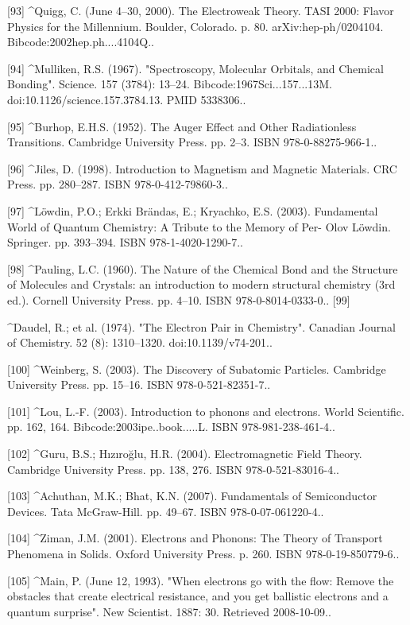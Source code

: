[93]
^Quigg, C. (June 4–30, 2000). The Electroweak Theory. TASI 2000: Flavor Physics for the Millennium. Boulder, Colorado. p. 80. arXiv:hep-ph/0204104. Bibcode:2002hep.ph....4104Q..

[94]
^Mulliken, R.S. (1967). "Spectroscopy, Molecular Orbitals, and Chemical Bonding". Science. 157 (3784): 13–24. Bibcode:1967Sci...157...13M. doi:10.1126/science.157.3784.13. PMID 5338306..

[95]
^Burhop, E.H.S. (1952). The Auger Effect and Other Radiationless Transitions. Cambridge University Press. pp. 2–3. ISBN 978-0-88275-966-1..

[96]
^Jiles, D. (1998). Introduction to Magnetism and Magnetic Materials. CRC Press. pp. 280–287. ISBN 978-0-412-79860-3..

[97]
^Löwdin, P.O.; Erkki Brändas, E.; Kryachko, E.S. (2003). Fundamental World of Quantum Chemistry: A Tribute to the Memory of Per- Olov Löwdin. Springer. pp. 393–394. ISBN 978-1-4020-1290-7..

[98]
^Pauling, L.C. (1960). The Nature of the Chemical Bond and the Structure of Molecules and Crystals: an introduction to modern structural chemistry (3rd ed.). Cornell University Press. pp. 4–10. ISBN 978-0-8014-0333-0..
[99]

^Daudel, R.; et al. (1974). "The Electron Pair in Chemistry". Canadian Journal of Chemistry. 52 (8): 1310–1320. doi:10.1139/v74-201..

[100]
^Weinberg, S. (2003). The Discovery of Subatomic Particles. Cambridge University Press. pp. 15–16. ISBN 978-0-521-82351-7..

[101]
^Lou, L.-F. (2003). Introduction to phonons and electrons. World Scientific. pp. 162, 164. Bibcode:2003ipe..book.....L. ISBN 978-981-238-461-4..

[102]
^Guru, B.S.; Hızıroğlu, H.R. (2004). Electromagnetic Field Theory. Cambridge University Press. pp. 138, 276. ISBN 978-0-521-83016-4..

[103]
^Achuthan, M.K.; Bhat, K.N. (2007). Fundamentals of Semiconductor Devices. Tata McGraw-Hill. pp. 49–67. ISBN 978-0-07-061220-4..

[104]
^Ziman, J.M. (2001). Electrons and Phonons: The Theory of Transport Phenomena in Solids. Oxford University Press. p. 260. ISBN 978-0-19-850779-6..

[105]
^Main, P. (June 12, 1993). "When electrons go with the flow: Remove the obstacles that create electrical resistance, and you get ballistic electrons and a quantum surprise". New Scientist. 1887: 30. Retrieved 2008-10-09..

